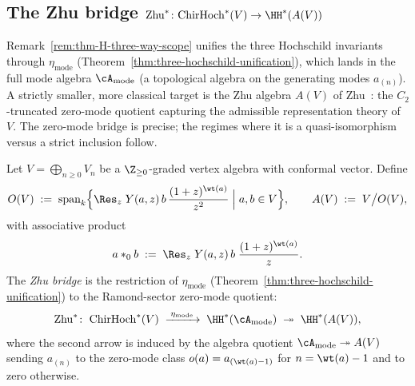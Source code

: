 \subsection{The Zhu bridge \texorpdfstring{$\mathrm{Zhu}^*\colon \mathrm{ChirHoch}^*(V)\to\HH^*(A(V))$}{Zhu: ChirHoch to HH(A(V))}}
\label{subsec:zhu-bridge}

Remark~\ref{rem:thm-H-three-way-scope} unifies the three Hochschild
invariants through $\eta_{\mathrm{mode}}$ (Theorem~\ref{thm:three-hochschild-unification}),
which lands in the full mode algebra $\cA_{\mathrm{mode}}$
(a topological algebra on the generating modes $a_{(n)}$). A
strictly smaller, more classical target is the Zhu algebra
$A(V)$ of Zhu~\cite{Zhu96}: the $C_2$-truncated zero-mode quotient
capturing the admissible representation theory of $V$. The zero-mode bridge is precise; the regimes where it is a
quasi-isomorphism versus a strict inclusion follow.

\begin{definition}%
\label{def:zhu-bridge}%
%
%
Let $V=\bigoplus_{n\ge 0}V_n$ be a $\Z_{\ge 0}$-graded vertex algebra
with conformal vector. Define
\[
 O(V) \;:=\; \mathrm{span}_k\Bigl\{
 \Res_z\; Y(a,z)\,b\,\frac{(1+z)^{\wt(a)}}{z^{2}}
 \;\Big|\; a,b\in V\Bigr\},
 \qquad
 A(V) \;:=\; V\big/ O(V),
\]
with associative product
\[
 a *_0 b \;:=\; \Res_z\; Y(a,z)\,b\;\frac{(1+z)^{\wt(a)}}{z}.
\]
The \emph{Zhu bridge} is the restriction of $\eta_{\mathrm{mode}}$
(Theorem~\ref{thm:three-hochschild-unification}) to the Ramond-sector
zero-mode quotient:
\[
 \mathrm{Zhu}^*\colon\;
 \mathrm{ChirHoch}^*(V)\;\xrightarrow{\;\eta_{\mathrm{mode}}\;}\;
 \HH^*(\cA_{\mathrm{mode}})\;\twoheadrightarrow\;
 \HH^*(A(V)),
\]
where the second arrow is induced by the algebra quotient
$\cA_{\mathrm{mode}}\twoheadrightarrow A(V)$ sending $a_{(n)}$
to the zero-mode class $o(a)=a_{(\wt(a)-1)}$ for $n=\wt(a)-1$ and to
zero otherwise.
\end{definition}

